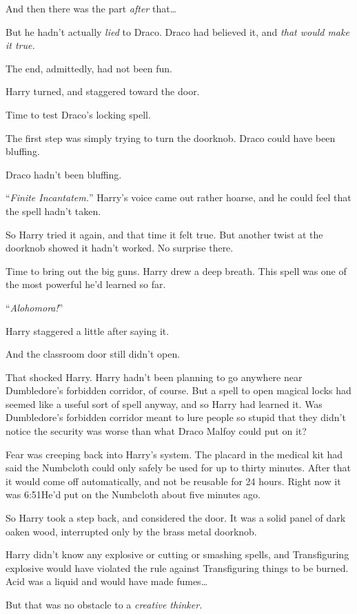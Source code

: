 And then there was the part \emph{after} that…

But he hadn’t actually \emph{lied} to Draco. Draco had believed it, and \emph{that would make it true.}

The end, admittedly, had not been fun.

Harry turned, and staggered toward the door.

Time to test Draco’s locking spell.

The first step was simply trying to turn the doorknob. Draco could have been bluffing.

Draco hadn’t been bluffing.

“\emph{Finite Incantatem.}” Harry’s voice came out rather hoarse, and he could feel that the spell hadn’t taken.

So Harry tried it again, and that time it felt true. But another twist at the doorknob showed it hadn’t worked. No surprise there.

Time to bring out the big guns. Harry drew a deep breath. This spell was one of the most powerful he’d learned so far.

“\emph{Alohomora!}”

Harry staggered a little after saying it.

And the classroom door still didn’t open.

That shocked Harry. Harry hadn’t been planning to go anywhere near Dumbledore’s forbidden corridor, of course. But a spell to open magical locks had seemed like a useful sort of spell anyway, and so Harry had learned it. Was Dumbledore’s forbidden corridor meant to lure people so stupid that they didn’t notice the security was worse than what Draco Malfoy could put on it?

Fear was creeping back into Harry’s system. The placard in the medical kit had said the Numbcloth could only safely be used for up to thirty minutes. After that it would come off automatically, and not be reusable for 24 hours. Right now it was 6:51\pm He’d put on the Numbcloth about five minutes ago.

So Harry took a step back, and considered the door. It was a solid panel of dark oaken wood, interrupted only by the brass metal doorknob.

Harry didn’t know any explosive or cutting or smashing spells, and Transfiguring explosive would have violated the rule against Transfiguring things to be burned. Acid was a liquid and would have made fumes…

But that was no obstacle to a \emph{creative thinker.}


